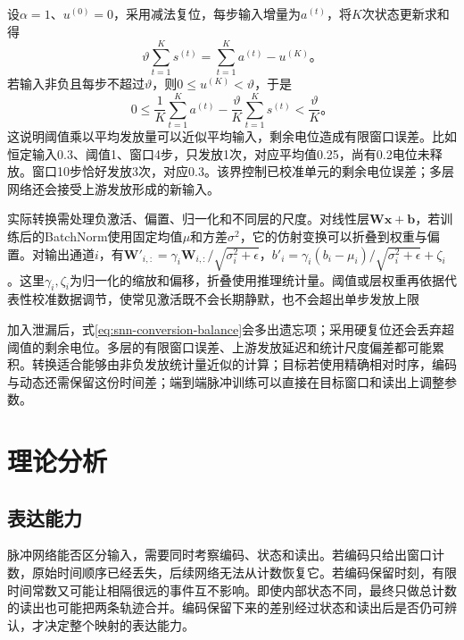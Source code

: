 设$\alpha=1$、$u^{(0)}=0$，采用减法复位，每步输入增量为$a^{(t)}$，将$K$次状态更新求和得
\begin{equation}
  \vartheta\sum_{t=1}^{K}s^{(t)}
  =\sum_{t=1}^{K}a^{(t)}-u^{(K)}\text{。}
  \label{eq:snn-conversion-balance}
\end{equation}
若输入非负且每步不超过$\vartheta$，则$0\leq u^{(K)}<\vartheta$，于是
\begin{equation}
  0\leq\frac1K\sum_{t=1}^{K}a^{(t)}
       -\frac{\vartheta}{K}\sum_{t=1}^{K}s^{(t)}
  <\frac{\vartheta}{K}\text{。}
  \label{eq:snn-conversion-error}
\end{equation}
这说明阈值乘以平均发放量可以近似平均输入，剩余电位造成有限窗口误差。比如恒定输入0.3、阈值1、窗口4步，只发放1次，对应平均值0.25，尚有0.2电位未释放。窗口10步恰好发放3次，对应0.3。该界控制已校准单元的剩余电位误差；多层网络还会接受上游发放形成的新输入。

实际转换需处理负激活、偏置、归一化和不同层的尺度。对线性层$\bm W\bm x+\bm b$，若训练后的BatchNorm使用固定均值$\mu$和方差$\sigma^2$，它的仿射变换可以折叠到权重与偏置。对输出通道$i$，有$\bm W'_{i,:}=\gamma_i\bm W_{i,:}/\sqrt{\sigma_i^2+\epsilon}$，$b'_i=\gamma_i(b_i-\mu_i)/\sqrt{\sigma_i^2+\epsilon}+\zeta_i$。这里$\gamma_i,\zeta_i$为归一化的缩放和偏移，折叠使用推理统计量。阈值或层权重再依据代表性校准数据调节，使常见激活既不会长期静默，也不会超出单步发放上限

加入泄漏后，式\eqref{eq:snn-conversion-balance}会多出遗忘项；采用硬复位还会丢弃超阈值的剩余电位。多层的有限窗口误差、上游发放延迟和统计尺度偏差都可能累积。转换适合能够由非负发放统计量近似的计算；目标若使用精确相对时序，编码与动态还需保留这份时间差；端到端脉冲训练可以直接在目标窗口和读出上调整参数。

\section{理论分析}
\label{sec:snn-analysis}

\subsection{表达能力}
\label{sec:snn-temporal-stability}

脉冲网络能否区分输入，需要同时考察编码、状态和读出。若编码只给出窗口计数，原始时间顺序已经丢失，后续网络无法从计数恢复它。若编码保留时刻，有限时间常数又可能让相隔很远的事件互不影响。即使内部状态不同，最终只做总计数的读出也可能把两条轨迹合并。编码保留下来的差别经过状态和读出后是否仍可辨认，才决定整个映射的表达能力。

